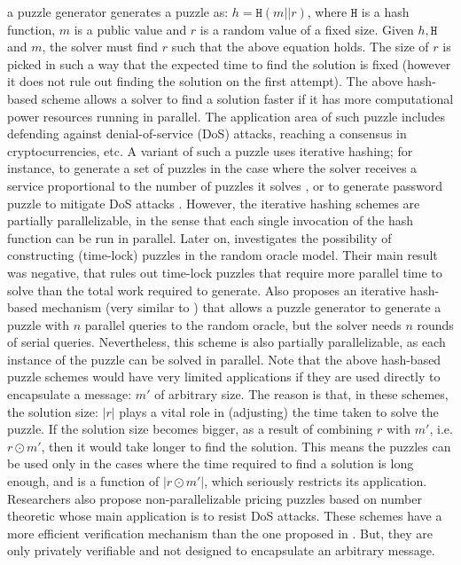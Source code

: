 a puzzle generator  generates a puzzle as: $h= \mathtt{H}(m||r)$, where $\mathtt{H}$ is a hash function, $m$ is a public value and $r$ is a random value of a fixed size. Given $h, \mathtt{H}$ and $m$, the solver must find $r$ such that the above equation holds. The size of $r$ is picked in such a way that the expected time to find the solution is fixed (however it does not rule out finding the solution on the first attempt). The above hash-based scheme allows a solver to find a solution faster if it has more computational power resources  running in parallel. The application area of such puzzle includes  defending against denial-of-service (DoS)  attacks, reaching a consensus in cryptocurrencies, etc. A  variant  of such a puzzle uses iterative hashing; for instance, to generate a set of puzzles  in the case where the solver receives a service proportional to the number of puzzles it solves \cite{groza2006chained},  or to generate password puzzle to mitigate DoS attacks \cite{Ma05}. However, the iterative hashing schemes are partially parallelizable, in the sense that each single invocation of the hash function can be run in parallel. Later on,  \cite{MahmoodyMV11} investigates the possibility of constructing (time-lock) puzzles in the random oracle model.  Their main result was negative, that rules out time-lock puzzles that require more parallel time to solve than the total work required to generate.  Also \cite{MahmoodyMV11} proposes an iterative hash-based mechanism (very similar to \cite{Ma05}) that allows a puzzle generator to generate a puzzle with $n$ parallel queries to the random oracle, but the solver needs $n$ rounds of serial queries. Nevertheless, this scheme is also partially parallelizable, as each instance of the puzzle can be solved in parallel. Note that the above hash-based puzzle schemes would have very limited applications if they are used directly to  encapsulate a message: $m'$ of arbitrary size. The reason is that, in these schemes,  the solution  size: $|r|$ plays a vital role in (adjusting) the  time taken to solve the puzzle. If the solution size becomes bigger, as a result of combining $r$ with $m'$, i.e. $r \odot m'$, then it would take longer to find the solution. This means  the puzzles can be used only in the cases where  the time required to find a solution is long enough, and is a function of $|r \odot m'|$, which seriously restricts its application. Researchers also propose non-parallelizable pricing puzzles based on number theoretic \cite{WatersJHF04,KuppusamyRSBN12,KarameC10} whose main application is to resist DoS attacks. These schemes  have a more efficient verification mechanism than the one proposed in \cite{Rivest:1996:TPT:888615}. But, they are only privately verifiable and not designed to encapsulate an arbitrary message. 





